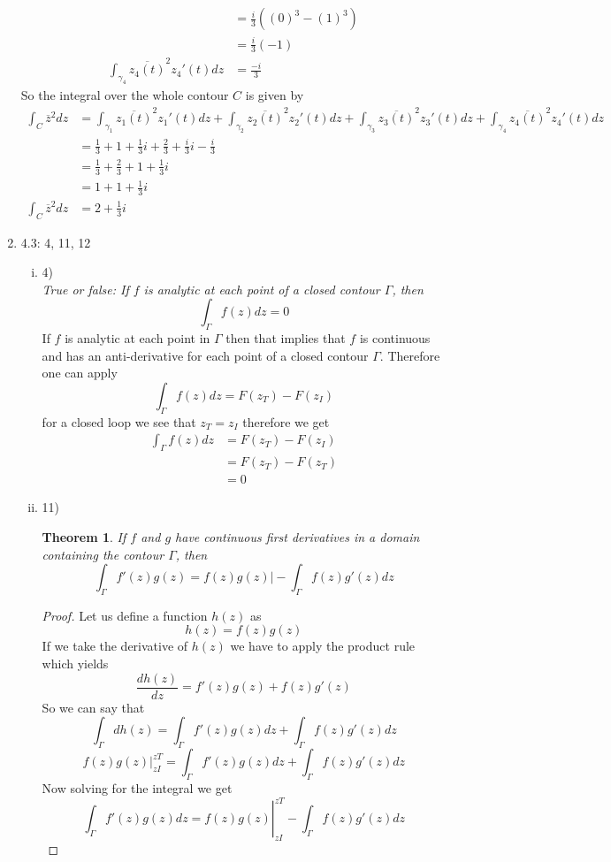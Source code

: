\documentclass[11pt]{article}
\newcommand{\zbar}{\overline{z}}
\begin{document}
\begin{enumerate}
\begin{align*}
&= \frac{i}{3}((0)^3-(1)^3)\\
&= \frac{i}{3}(-1)\\
\int_{\gamma_4}\overline{z_4(t)}^2z_4'(t)dz &= \frac{-i}{3}
\end{align*}
So the integral over the whole contour $C$ is given by
\begin{align*}
\int_C\zbar^2dz &= \int_{\gamma_1}\overline{z_1(t)}^2z_1'(t)dz+\int_{\gamma_2}\overline{z_2(t)}^2z_2'(t)dz+\int_{\gamma_3}\overline{z_3(t)}^2z_3'(t)dz+\int_{\gamma_4}\overline{z_4(t)}^2z_4'(t)dz\\
&= \frac{1}{3} + 1 + \frac{1}{3}i+ \frac{2}{3}+ \frac{i}{3}i - \frac{i}{3}\\
&= \frac{1}{3} +\frac{2}{3}+ 1 + \frac{1}{3}i\\
&= 1+ 1 + \frac{1}{3}i\\
\int_C\zbar^2dz &= 2 + \frac{1}{3}i
\end{align*}

\item 4.3:  4, 11, 12
\begin{enumerate}[(i)]
\item 4)\\
\textit{True or false: If $f$ is analytic at each point of a closed contour $\Gamma$, then $$\int_{\Gamma}f(z)dz=0$$}
If $f$ is analytic at each point in $\Gamma$ then that implies that $f$ is continuous and has an anti-derivative for each point of a closed contour $\Gamma$. Therefore one can apply 
$$\int_{\Gamma}f(z)dz = F(z_T) - F(z_I)$$
for a closed loop we see that $z_T = z_I$ therefore we get
\begin{align*}
\int_{\Gamma}f(z)dz &= F(z_T) - F(z_I)\\
&= F(z_T) - F(z_T)\\
&= 0
\end{align*}

\item 11)\\
\newtheorem{Theo11}{Theorem}
\begin{Theo11}
If $f$ and $g$ have continuous first derivatives in a domain containing the contour $\Gamma$, then
$$\int_{\Gamma} f'(z)g(z) = f(z)g(z)\vert-\int_{\Gamma} f(z)g'(z)dz$$
\end{Theo11}
\begin{proof}
Let us define a function $h(z)$ as
$$h(z) = f(z)g(z)$$
If we take the derivative of $h(z)$ we have to apply the product rule which yields
$$\frac{dh(z)}{dz} = f'(z)g(z)+f(z)g'(z)$$
So we can say that
$$\int_{\Gamma}dh(z) =\int_{\Gamma} f'(z)g(z)dz+\int_{\Gamma}f(z)g'(z)dz$$
$$f(z)g(z)|_{zI}^{zT} =\int_{\Gamma} f'(z)g(z)dz+\int_{\Gamma}f(z)g'(z)dz$$
Now solving for the integral we get
$$\left.\int_{\Gamma} f'(z)g(z)dz = f(z)g(z)\right|_{zI}^{zT} -\int_{\Gamma}f(z)g'(z)dz$$
\end{proof}


\end{enumerate}
\end{enumerate}
\end{document}
